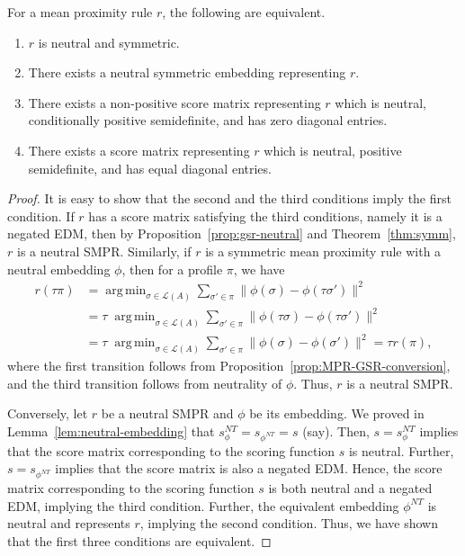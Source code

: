 \documentclass[prodmode]{acmsmall-ec14}
\newcommand{\calL}{{\mathcal{L}}}
\newcommand{\rank}{{\calL(A)}}
\DeclareMathOperator*{\argmin}{arg\,min}
\newcommand{\nt}{NT}
\begin{document}
\begin{theorem}
For a mean proximity rule $r$, the following are equivalent. 
\begin{enumerate}
\item $r$ is neutral and symmetric.
\item There exists a neutral symmetric embedding representing $r$.
\item There exists a non-positive score matrix representing $r$ which is neutral, conditionally positive semidefinite, and has zero diagonal entries. 
\item There exists a score matrix representing $r$ which is neutral, positive semidefinite, and has equal diagonal entries.
\end{enumerate}
\label{thm:neutral-smpr}
\end{theorem}
\begin{proof}
It is easy to show that the second and the third conditions imply the first condition. If $r$ has a score matrix satisfying the third conditions, namely it is a negated EDM, then by Proposition~\ref{prop:gsr-neutral} and Theorem~\ref{thm:symm}, $r$ is a neutral SMPR. Similarly, if $r$ is a symmetric mean proximity rule with a neutral embedding $\phi$, then for a profile $\pi$, we have 
\begin{align*}
r(\tau \pi) &= \argmin_{\sigma \in \rank} \sum_{\sigma' \in \pi} \|\phi(\sigma)-\phi(\tau \sigma')\|^2 \\
&= \tau \; \argmin_{\sigma \in \rank} \sum_{\sigma' \in \pi} \|\phi(\tau \sigma)-\phi(\tau \sigma')\|^2 \\
&= \tau \; \argmin_{\sigma \in \rank} \sum_{\sigma' \in \pi} \|\phi(\sigma)-\phi(\sigma')\|^2 = \tau r(\pi),
\end{align*}
where the first transition follows from Proposition~\ref{prop:MPR-GSR-conversion}, and the third transition follows from neutrality of $\phi$. Thus, $r$ is a neutral SMPR. 

Conversely, let $r$ be a neutral SMPR and $\phi$ be its embedding. We proved in Lemma~\ref{lem:neutral-embedding} that $s_{\phi}^{\nt} = s_{\phi^{\nt}} = s$ (say). Then, $s = s_{\phi}^{\nt}$ implies that the score matrix corresponding to the scoring function $s$ is neutral. Further, $s = s_{\phi^{\nt}}$ implies that the score matrix is also a negated EDM. Hence, the score matrix corresponding to the scoring function $s$ is both neutral and a negated EDM, implying the third condition. Further, the equivalent embedding $\phi^{\nt}$ is neutral and represents $r$, implying the second condition. Thus, we have shown that the first three conditions are equivalent. 


\end{proof}
\end{document}
